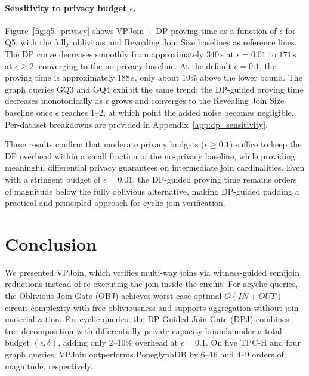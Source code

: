 \documentclass[sigconf]{acmart}
\begin{document}
\paragraph{Sensitivity to privacy budget $\epsilon$.}
Figure~\ref{fig:q5_privacy} shows VPJoin + DP proving time as a function of $\epsilon$ for Q5, with the fully oblivious and Revealing Join Size baselines as reference lines. The DP curve decreases smoothly from approximately $340$\,s at $\epsilon = 0.01$ to $171$\,s at $\epsilon \ge 2$, converging to the no-privacy baseline. At the default $\epsilon = 0.1$, the proving time is approximately $188$\,s, only about $10\%$ above the lower bound. The graph queries GQ3 and GQ4 exhibit the same trend: the DP-guided proving time decreases monotonically as $\epsilon$ grows and converges to the Revealing Join Size baseline once $\epsilon$ reaches $1$--$2$, at which point the added noise becomes negligible. Per-dataset breakdowns are provided in Appendix~\ref{app:dp_sensitivity}.

These results confirm that moderate privacy budgets ($\epsilon \ge 0.1$) suffice to keep the DP overhead within a small fraction of the no-privacy baseline, while providing meaningful differential privacy guarantees on intermediate join cardinalities. Even with a stringent budget of $\epsilon = 0.01$, the DP-guided proving time remains orders of magnitude below the fully oblivious alternative, making DP-guided padding a practical and principled approach for cyclic join verification.


\section{Conclusion}
\label{sec:conclusion}

We presented VPJoin, which verifies multi-way joins via witness-guided semijoin reductions instead of re-executing the join inside the circuit. For acyclic queries, the Oblivious Join Gate (OBJ) achieves worst-case optimal $O(\mathit{IN} + \mathit{OUT})$ circuit complexity with free obliviousness and supports aggregation without join materialization. For cyclic queries, the DP-Guided Join Gate (DPJ) combines tree decomposition with differentially private capacity bounds under a total budget $(\epsilon,\delta)$, adding only $2$--$10\%$ overhead at $\epsilon = 0.1$. On five TPC-H and four graph queries, VPJoin outperforms PoneglyphDB by $6$--$16$ and $4$--$9$ orders of magnitude, respectively.



\end{document}

